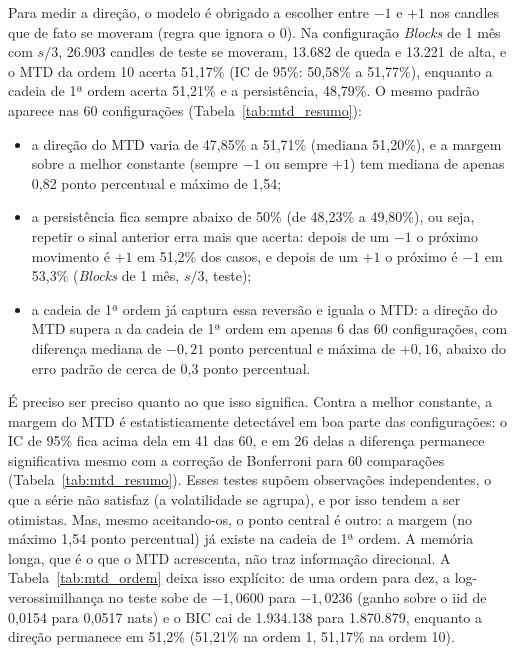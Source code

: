 \documentclass[
    12pt,                %
    openright,           %
    oneside,             %
    a4paper,             %
    english,             %
    brazil               %
]{abntex2}
\begin{document}
Para medir a direção, o modelo é obrigado a escolher entre $-1$ e $+1$ nos candles que de fato se moveram (regra que ignora o 0). Na configuração \textit{Blocks} de 1 mês com $s/3$, 26.903 candles de teste se moveram, 13.682 de queda e 13.221 de alta, e o MTD da ordem 10 acerta 51,17\% (IC de 95\%: 50,58\% a 51,77\%), enquanto a cadeia de 1ª ordem acerta 51,21\% e a persistência, 48,79\%. O mesmo padrão aparece nas 60 configurações (Tabela~\ref{tab:mtd_resumo}):
\begin{itemize}
  \item a direção do MTD varia de 47,85\% a 51,71\% (mediana 51,20\%), e a margem sobre a melhor constante (sempre $-1$ ou sempre $+1$) tem mediana de apenas 0,82 ponto percentual e máximo de 1,54;
  \item a persistência fica sempre abaixo de 50\% (de 48,23\% a 49,80\%), ou seja, repetir o sinal anterior erra mais que acerta: depois de um $-1$ o próximo movimento é $+1$ em 51,2\% dos casos, e depois de um $+1$ o próximo é $-1$ em 53,3\% (\textit{Blocks} de 1 mês, $s/3$, teste);
  \item a cadeia de 1ª ordem já captura essa reversão e iguala o MTD: a direção do MTD supera a da cadeia de 1ª ordem em apenas 6 das 60 configurações, com diferença mediana de $-0{,}21$ ponto percentual e máxima de $+0{,}16$, abaixo do erro padrão de cerca de 0,3 ponto percentual.
\end{itemize}

É preciso ser preciso quanto ao que isso significa. Contra a melhor constante, a margem do MTD é estatisticamente detectável em boa parte das configurações: o IC de 95\% fica acima dela em 41 das 60, e em 26 delas a diferença permanece significativa mesmo com a correção de Bonferroni para 60 comparações (Tabela~\ref{tab:mtd_resumo}). Esses testes supõem observações independentes, o que a série não satisfaz (a volatilidade se agrupa), e por isso tendem a ser otimistas. Mas, mesmo aceitando-os, o ponto central é outro: a margem (no máximo 1,54 ponto percentual) já existe na cadeia de 1ª ordem. A memória longa, que é o que o MTD acrescenta, não traz informação direcional. A Tabela~\ref{tab:mtd_ordem} deixa isso explícito: de uma ordem para dez, a log-verossimilhança no teste sobe de $-1{,}0600$ para $-1{,}0236$ (ganho sobre o iid de 0,0154 para 0,0517 nats) e o BIC cai de 1.934.138 para 1.870.879, enquanto a direção permanece em 51,2\% (51,21\% na ordem 1, 51,17\% na ordem 10).
\end{document}
